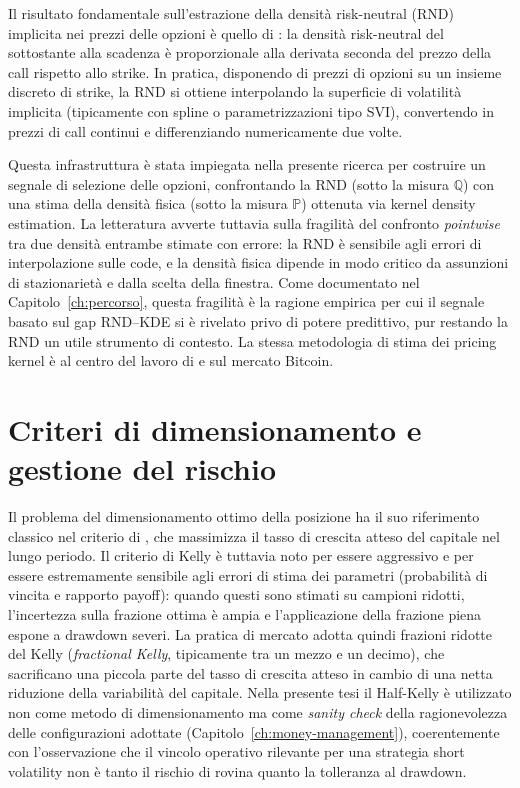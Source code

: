 Il risultato fondamentale sull'estrazione della densità risk-neutral (RND)
implicita nei prezzi delle opzioni è quello di \citet{breeden1978prices}:
la densità risk-neutral del sottostante alla scadenza è proporzionale alla
derivata seconda del prezzo della call rispetto allo strike. In pratica,
disponendo di prezzi di opzioni su un insieme discreto di strike, la RND si
ottiene interpolando la superficie di volatilità implicita (tipicamente con
spline o parametrizzazioni tipo SVI), convertendo in prezzi di call
continui e differenziando numericamente due volte.

Questa infrastruttura è stata impiegata nella presente ricerca per
costruire un segnale di selezione delle opzioni, confrontando la RND (sotto
la misura $\mathbb{Q}$) con una stima della densità fisica (sotto la misura
$\mathbb{P}$) ottenuta via kernel density estimation. La letteratura
avverte tuttavia sulla fragilità del confronto \emph{pointwise} tra due
densità entrambe stimate con errore: la RND è sensibile agli errori di
interpolazione sulle code, e la densità fisica dipende in modo critico da
assunzioni di stazionarietà e dalla scelta della finestra. Come documentato
nel Capitolo~\ref{ch:percorso}, questa fragilità è la ragione empirica per
cui il segnale basato sul gap RND--KDE si è rivelato privo di potere
predittivo, pur restando la RND un utile strumento di contesto. La stessa
metodologia di stima dei pricing kernel è al centro del lavoro di
\citet{winkel2023pricing} e \citet{almeida2024risk} sul mercato Bitcoin.

\section{Criteri di dimensionamento e gestione del rischio}
\label{sec:lit-sizing}

Il problema del dimensionamento ottimo della posizione ha il suo
riferimento classico nel criterio di \citet{kelly1956new}, che massimizza
il tasso di crescita atteso del capitale nel lungo periodo. Il criterio di
Kelly è tuttavia noto per essere aggressivo e per essere estremamente
sensibile agli errori di stima dei parametri (probabilità di vincita e
rapporto payoff): quando questi sono stimati su campioni ridotti,
l'incertezza sulla frazione ottima è ampia e l'applicazione della frazione
piena espone a drawdown severi. La pratica di mercato adotta quindi
frazioni ridotte del Kelly (\emph{fractional Kelly}, tipicamente tra un
mezzo e un decimo), che sacrificano una piccola parte del tasso di crescita
atteso in cambio di una netta riduzione della variabilità del capitale.
Nella presente tesi il Half-Kelly è utilizzato non come metodo di
dimensionamento ma come \emph{sanity check} della ragionevolezza delle
configurazioni adottate (Capitolo~\ref{ch:money-management}), coerentemente
con l'osservazione che il vincolo operativo rilevante per una strategia
short volatility non è tanto il rischio di rovina quanto la tolleranza al
drawdown.

